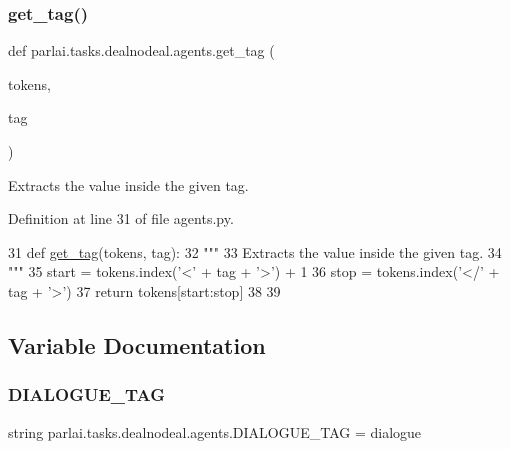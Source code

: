 \subsubsection{\texorpdfstring{get\+\_\+tag()}{get\_tag()}}
{\footnotesize\ttfamily def parlai.\+tasks.\+dealnodeal.\+agents.\+get\+\_\+tag (\begin{DoxyParamCaption}\item[{}]{tokens,  }\item[{}]{tag }\end{DoxyParamCaption})}

\begin{DoxyVerb}Extracts the value inside the given tag.
\end{DoxyVerb}
 

Definition at line 31 of file agents.\+py.


\begin{DoxyCode}
31 \textcolor{keyword}{def }\hyperlink{namespaceparlai_1_1tasks_1_1dealnodeal_1_1agents_a7a1e5d8435af234bbf07491e866bb1fd}{get\_tag}(tokens, tag):
32     \textcolor{stringliteral}{"""}
33 \textcolor{stringliteral}{    Extracts the value inside the given tag.}
34 \textcolor{stringliteral}{    """}
35     start = tokens.index(\textcolor{stringliteral}{'<'} + tag + \textcolor{stringliteral}{'>'}) + 1
36     stop = tokens.index(\textcolor{stringliteral}{'</'} + tag + \textcolor{stringliteral}{'>'})
37     \textcolor{keywordflow}{return} tokens[start:stop]
38 
39 
\end{DoxyCode}


\subsection{Variable Documentation}
\mbox{\label{namespaceparlai_1_1tasks_1_1dealnodeal_1_1agents_aec6dc6ffdac8f0d235959647cf3dd95d}} 
\subsubsection{\texorpdfstring{D\+I\+A\+L\+O\+G\+U\+E\+\_\+\+T\+AG}{DIALOGUE\_TAG}}
{\footnotesize\ttfamily string parlai.\+tasks.\+dealnodeal.\+agents.\+D\+I\+A\+L\+O\+G\+U\+E\+\_\+\+T\+AG = \textquotesingle{}dialogue\textquotesingle{}}



